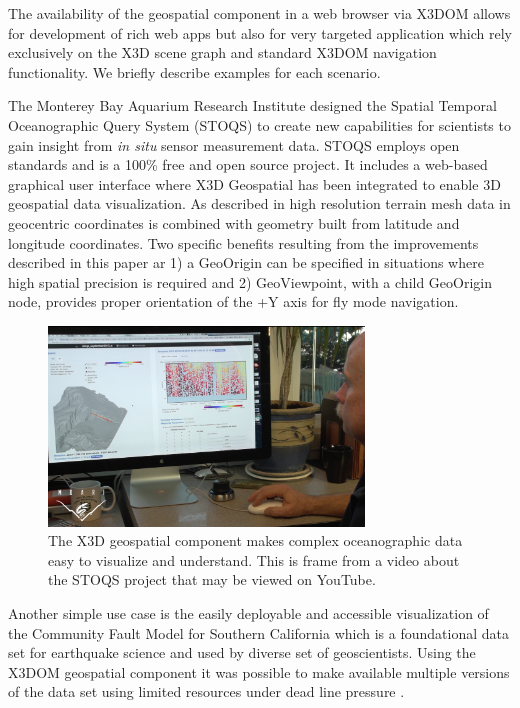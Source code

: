 \documentclass{acmsiggraph}                     %
\begin{document}
The availability of the geospatial component in a web browser via X3DOM allows for development of
rich  web apps but also for very targeted application which rely exclusively on the X3D scene graph
and standard X3DOM navigation functionality. We briefly describe examples for each scenario.

The Monterey Bay Aquarium Research Institute designed the Spatial Temporal Oceanographic Query
System (STOQS) \cite{stoqsyoutube} to create new capabilities for scientists to gain insight from
\textit{in situ} sensor measurement data. STOQS employs open standards and is a 100\% free and open
source project. It includes a web-based graphical user interface where X3D Geospatial has been
integrated to enable 3D geospatial data visualization. As described in \cite{mccann14} high
resolution terrain mesh data in geocentric coordinates is combined with geometry built from latitude
and longitude coordinates. Two specific benefits resulting from the improvements described in this
paper ar 1) a GeoOrigin can be specified in situations where high spatial precision is required and
2) GeoViewpoint, with a child GeoOrigin node, provides proper orientation of the +Y axis for fly
mode navigation.

\begin{figure}[htbp] \centering \includegraphics[width=3.3in]{Application_STOQS.png} \caption{The
  X3D geospatial component makes complex oceanographic data easy to visualize and understand. This
is frame from a video about the STOQS project that may be viewed on YouTube.}
\label{fig:Application_STOQS.png} \end{figure}

Another simple use case is the easily deployable and accessible visualization of the Community Fault
Model for Southern California \cite{plesch07} which is a foundational data set for earthquake
science and used by diverse set of geoscientists. Using the X3DOM geospatial component it was
possible to make available multiple versions of the data set using limited resources under dead line
pressure \cite{sger14}.
\end{document}
